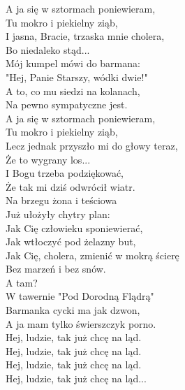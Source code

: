 A ja się w sztormach poniewieram, \\
Tu mokro i piekielny ziąb, \\
I jasna, Bracie, trzaska mnie cholera, \\
Bo niedaleko stąd... \\

Mój kumpel mówi do barmana: \\
"Hej, Panie Starszy, wódki dwie!" \\
A to, co mu siedzi na kolanach, \\
Na pewno sympatyczne jest. \\

A ja się w sztormach poniewieram, \\
Tu mokro i piekielny ziąb, \\
Lecz jednak przyszło mi do głowy teraz, \\
Że to wygrany los... \\

I Bogu trzeba podziękować, \\
Że tak mi dziś odwrócił wiatr. \\
Na brzegu żona i teściowa \\
Już ułożyły chytry plan: \\

Jak Cię człowieku sponiewierać, \\
Jak wtłoczyć pod żelazny but, \\
Jak Cię, cholera, zmienić w mokrą ścierę \\
Bez marzeń i bez snów. \\

A tam? \\

W tawernie "Pod Dorodną Flądrą" \\
Barmanka cycki ma jak dzwon, \\
A ja mam tylko świerszczyk porno. \\
Hej, ludzie, tak już chcę na ląd. \\
Hej, ludzie, tak już chcę na ląd. \\
Hej, ludzie, tak już chcę na ląd. \\
Hej, ludzie, tak już chcę na ląd... \\
